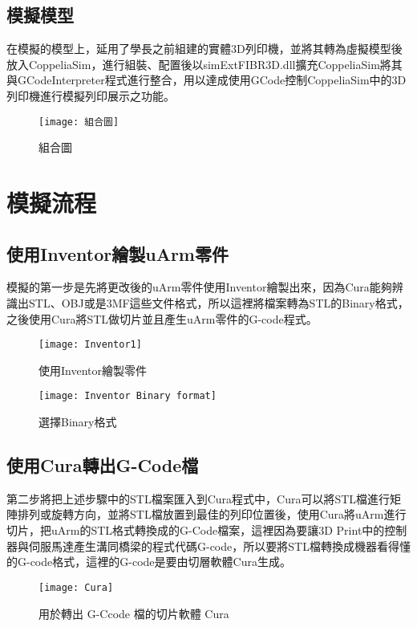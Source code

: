 \subsection{模擬模型}
 在模擬的模型上，延用了學長之前組建的實體3D列印機，並將其轉為虛擬模型後放入CoppeliaSim，進行組裝、配置後以simExtFIBR3D.dll擴充CoppeliaSim將其與GCodeInterpreter程式進行整合，用以達成使用GCode控制CoppeliaSim中的3D列印機進行模擬列印展示之功能。\\
\begin{figure}[htb]
\center
\texttt{[image: 組合圖]}
\caption{\Large 組合圖}
\label{組合圖}
\end{figure}


\section{模擬流程}


\subsection{使用Inventor繪製uArm零件}
 模擬的第一步是先將更改後的uArm零件使用Inventor繪製出來，因為Cura能夠辨識出STL、OBJ或是3MF這些文件格式，所以這裡將檔案轉為STL的Binary格式，之後使用Cura將STL做切片並且產生uArm零件的G-code程式。\\
\begin{figure}[htb]
\begin{center}
\texttt{[image: Inventor1]}
\caption{\Large 使用Inventor繪製零件}\label{Inventor1}
\end{center}
\end{figure}

\begin{figure}[htb]
\begin{center}
\texttt{[image: Inventor Binary format]}
\caption{\Large 選擇Binary格式}\label{Inventor Binary format}
\end{center}
\end{figure}

\subsection{使用Cura轉出G-Code檔}
 第二步將把上述步驟中的STL檔案匯入到Cura程式中，Cura可以將STL檔進行矩陣排列或旋轉方向，並將STL檔放置到最佳的列印位置後，使用Cura將uArm進行切片，把uArm的STL格式轉換成的G-Code檔案，這裡因為要讓3D Print中的控制器與伺服馬達產生溝同橋梁的程式代碼G-code，所以要將STL檔轉換成機器看得懂的G-code格式，這裡的G-code是要由切層軟體Cura生成。\\
\begin{figure}[htb]
\begin{center}
\texttt{[image: Cura]}
\caption{\Large 用於轉出 G-Ccode 檔的切片軟體 Cura}\label{Cura}
\end{center}
\end{figure}

